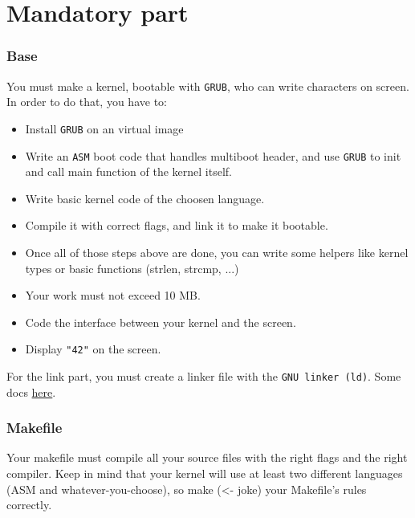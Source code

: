 \documentclass{42-en}
\begin{document}
\newpage
\chapter{Mandatory part}

	\subsection{Base}
		You must make a kernel, bootable with \texttt{GRUB}, who can
		write characters on screen.\\
		In order to do that, you have to:
		\begin{itemize}\itemsep1pt
			\item Install \texttt{GRUB} on an virtual image
			\item Write an \texttt{ASM} boot code that handles multiboot
			header,	and use \texttt{GRUB} to init and call main function
			of the kernel itself.
			\item Write basic kernel code of the choosen language.
			\item Compile it with correct flags, and link it to make it bootable.
			\item Once all of those steps above are done, you can write some
			helpers like kernel types or basic functions (strlen, strcmp, ...)
			\item Your work must not exceed 10 MB.
			\item Code the interface between your kernel and the screen.
            \item Display \texttt{"42"} on the screen.
		\end{itemize}
		For the link part, you must create a linker file with the
		\texttt{GNU linker (ld)}. Some docs \href{http://www.math.utah.edu/docs/info/ld_3.html#SEC4}
		{here}.\\

	\subsection{Makefile}
		Your makefile must compile all your source files with the right flags
		and the	right compiler. Keep in mind that your kernel will use at
		least two different	languages (ASM and whatever-you-choose), so make
		(<- joke) your Makefile's rules correctly.\\
\end{document}
